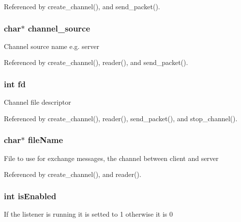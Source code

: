 Referenced by create\+\_\+channel(), and send\+\_\+packet().

\subsubsection[{\texorpdfstring{channel\+\_\+source}{channel_source}}]{\setlength{\rightskip}{0pt plus 5cm}char$\ast$ channel\+\_\+source}\hypertarget{structchannel__t_a0a72aa1c901810c34da12df46f40041e}{}\label{structchannel__t_a0a72aa1c901810c34da12df46f40041e}
Channel source name e.\+g. server 

Referenced by create\+\_\+channel(), reader(), and send\+\_\+packet().

\subsubsection[{\texorpdfstring{fd}{fd}}]{\setlength{\rightskip}{0pt plus 5cm}int fd}\hypertarget{structchannel__t_a6f8059414f0228f0256115e024eeed4b}{}\label{structchannel__t_a6f8059414f0228f0256115e024eeed4b}
Channel file descriptor 

Referenced by create\+\_\+channel(), reader(), send\+\_\+packet(), and stop\+\_\+channel().

\subsubsection[{\texorpdfstring{file\+Name}{fileName}}]{\setlength{\rightskip}{0pt plus 5cm}char$\ast$ file\+Name}\hypertarget{structchannel__t_a25c8761bc1f523fe6a53db546ae83add}{}\label{structchannel__t_a25c8761bc1f523fe6a53db546ae83add}
File to use for exchange messages, the channel between client and server 

Referenced by create\+\_\+channel(), and reader().

\subsubsection[{\texorpdfstring{is\+Enabled}{isEnabled}}]{\setlength{\rightskip}{0pt plus 5cm}int is\+Enabled}\hypertarget{structchannel__t_a5c56d01677044a9e8009acf457aa1a37}{}\label{structchannel__t_a5c56d01677044a9e8009acf457aa1a37}
If the listener is running it is setted to 1 otherwise it is 0 

